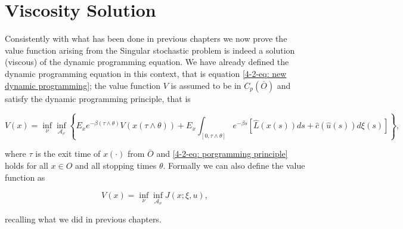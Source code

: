 \section{Viscosity Solution}

Consistently with what has been done in previous chapters we now prove the value function arising from the Singular stochastic problem is indeed a solution (viscous) of the dynamic programming equation. We have already defined the dynamic programming equation in this context, that is equation \eqref{4-2-eq: new dynamic programming}; the value function $V$ is assumed to be in $C_p(\overline{O})$ and satisfy the dynamic programming principle, that is 

\begin{equation}\label{4-2-eq: porgramming principle}
    V(x) = \inf_{\nu} \inf_{\mathcal{A}_{\nu}} \left\{E_xe^{-\beta(\tau\land\theta)}V(x(\tau\land\theta)) + E_x\int_{[0,\tau\land\theta]}e^{-\beta s}\left[\hat{L}(x(s))ds + \hat{c}(\hat{u}(s))d\xi(s)\right]\right\},
\end{equation}

where $\tau$ is the exit time of $x(\cdot)$ from $\overline{O}$ and \eqref{4-2-eq: porgramming principle} holds for all $x\in O$ and all stopping times $\theta$. Formally we can also define the value function as

\begin{equation}
    V(x) = \inf_{\nu}\inf_{\mathcal{A}_{\nu}} J(x;\xi,u),
\end{equation}

recalling what we did in previous chapters.

